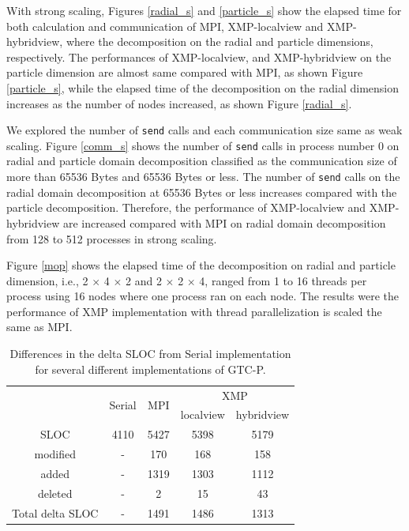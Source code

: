With strong scaling, Figures \ref{radial_s} and \ref{particle_s} show the elapsed time for both calculation and communication of MPI, XMP-localview and XMP-hybridview, where the decomposition on the radial and particle dimensions, respectively. The performances of XMP-localview, and XMP-hybridview on the particle dimension are almost same compared with MPI, as shown Figure \ref{particle_s}, while the elapsed time of the decomposition on the radial dimension increases as the number of nodes increased, as shown Figure \ref{radial_s}. 

We explored the number of {\tt send} calls and each communication size same as weak scaling. Figure \ref{comm_s} shows the number of {\tt send} calls in process number 0 on radial and particle domain decomposition classified as the communication size of more than 65536 Bytes and 65536 Bytes or less. The number of {\tt send} calls on the radial domain decomposition at 65536 Bytes or less increases compared with the particle decomposition. Therefore, the performance of XMP-localview and XMP-hybridview are increased compared with MPI on radial domain decomposition from 128 to 512 processes in strong scaling.

Figure \ref{mop} shows the elapsed time of the decomposition on radial and particle dimension, i.e., 2 $\times$ 4 $\times$ 2 and 2 $\times$ 2 $\times$ 4, ranged from 1 to 16 threads per process using 16 nodes where one process ran on each node. The results were the performance of XMP implementation with thread parallelization is scaled the same as MPI.


\begin{table}[t]
\begin{center}
\caption{Differences in the delta SLOC from Serial implementation for several different implementations of GTC-P.}
{\scriptsize
\label{gtcp_code}
\begin{tabular}{c|c|c|c|c} \hline\hline
 & \multirow{2}{*}{Serial} & \multirow{2}{*}{MPI} & \multicolumn{2}{c}{XMP} \\ \cline{4-5}
 & & & localview & hybridview \\ \hline
SLOC			& 4110 	& 5427 	& 5398 	& 5179\\ \hline
modified 			& - 		& 170 	& 168 	& 158\\ 
added     			& -    	& 1319 	& 1303 	& 1112\\
deleted   			& - 		& 2 		& 15 		& 43\\ \hline
Total delta SLOC 	& - 		& 1491	& 1486 	& 1313\\ \hline
\end{tabular}
}
\end{center}
\end{table}


